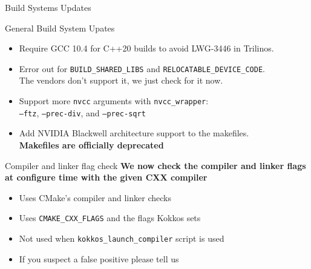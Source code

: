 
\begin{frame}[fragile]

  {\Huge Build Systems Updates}

  \vspace{10pt}

\end{frame}


\begin{frame}[fragile]{General Build System Upates}
    \begin{itemize}
        \item Require GCC 10.4 for C++20 builds to avoid LWG-3446 in Trilinos. %
        \item Error out for  \texttt{BUILD\_SHARED\_LIBS} and \texttt{RELOCATABLE\_DEVICE\_CODE}. \\  The vendors don't support it, we just check for it now. %
        \item Support more \texttt{nvcc} arguments with \texttt{nvcc\_wrapper}: \\ \texttt{--ftz}, \texttt{--prec-div}, and \texttt{--prec-sqrt} %
        \item Add NVIDIA Blackwell architecture support to the makefiles. \\  \textbf{Makefiles are officially deprecated} %

    \end{itemize}
\end{frame}

\begin{frame}[fragile]{Compiler and linker flag check}
  \centering
  \textbf{We now check the compiler and linker flags at configure time with the given CXX compiler} %
    \begin{itemize}
        \item Uses CMake's compiler and linker checks
        \item Uses \texttt{CMAKE\_CXX\_FLAGS} and the flags Kokkos sets
        \item Not used when \texttt{kokkos\_launch\_compiler} script is used
        \item If you suspect a false positive please tell us
    \end{itemize}
\end{frame}

